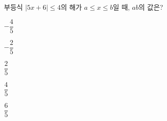부등식 $|5x+6|\le 4$의 해가 $a\le x\le b$일 때, $ab$의 값은?
\begin{choices32}{\rule[-3ex]{0pt}{8ex}$-\dfrac{4}{5}$}{\rule[-3ex]{0pt}{8ex}$-\dfrac{2}{5}$}{\rule[-3ex]{0pt}{8ex}$\dfrac{2}{5}$}{\rule[-3ex]{0pt}{8ex}$\dfrac{4}{5}$}{\rule[-3ex]{0pt}{8ex}$\dfrac{6}{5}$}\end{choices32}
